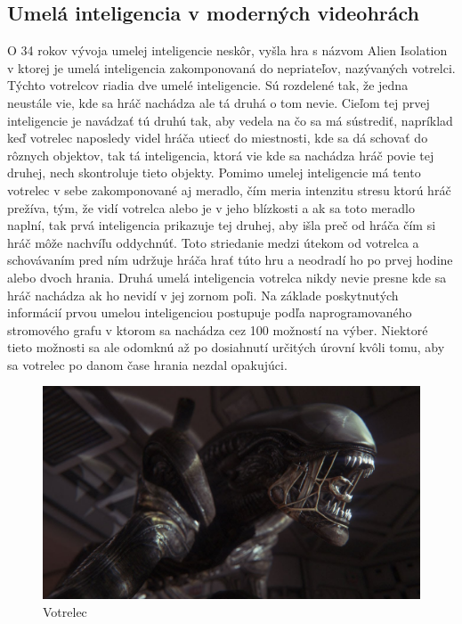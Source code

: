 \documentclass[10pt,oneside,slovak,a4paper]{article}
\begin{document}
\subsection{Umelá inteligencia v moderných videohrách} \label{kapitola2.3}
O 34 rokov vývoja umelej inteligencie neskôr, vyšla hra s názvom Alien Isolation v ktorej je umelá inteligencia zakomponovaná do nepriateľov, nazývaných votrelci. Týchto votrelcov riadia dve umelé inteligencie. \cite{AlienIsolationAI} 
Sú rozdelené tak, že jedna neustále vie, kde sa hráč nachádza ale tá druhá o tom nevie. Cieľom tej prvej inteligencie je navádzať tú druhú tak, aby vedela na čo sa má sústrediť, napríklad keď votrelec naposledy videl hráča utiecť do miestnosti, kde sa dá schovať do rôznych objektov, tak tá inteligencia, ktorá vie kde sa nachádza hráč povie tej druhej, nech skontroluje tieto objekty. Pomimo umelej inteligencie má tento votrelec v sebe zakomponované aj meradlo, čím meria intenzitu stresu ktorú hráč prežíva, tým, že vidí votrelca alebo je v jeho blízkosti a ak sa toto meradlo naplní, tak prvá inteligencia prikazuje tej druhej, aby išla preč od hráča čím si hráč môže nachvíľu oddychnúť. Toto striedanie medzi útekom od votrelca a schovávaním pred ním udržuje hráča hrať túto hru a neodradí ho po prvej hodine alebo dvoch hrania. 
Druhá umelá inteligencia votrelca nikdy nevie presne kde sa hráč nachádza ak ho nevidí v jej zornom poľi. Na základe poskytnutých informácií prvou umelou inteligenciou postupuje podľa naprogramovaného stromového grafu v ktorom sa nachádza cez 100 možností na výber. Niektoré tieto možnosti sa ale odomknú až po dosiahnutí určitých úrovní kvôli tomu, aby sa votrelec po danom čase hrania nezdal opakujúci.
\begin{figure}[tbh]
	\centering
	\includegraphics[scale=0.25]{alien.jpg}
	\caption{Votrelec}
	\label{obr4}
\end{figure}
\end{document}
